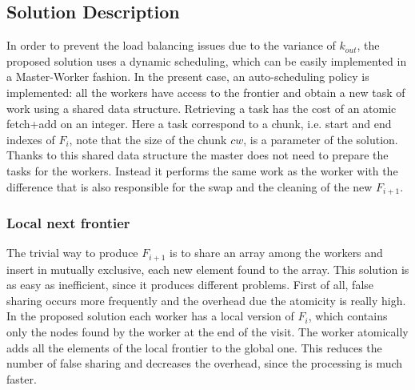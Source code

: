\subsection{Solution Description}
In order to prevent the load balancing issues 
due to the variance of $k_{out}$, the proposed solution
uses a dynamic scheduling, which can be easily implemented
in a Master-Worker fashion. In the
present case, an auto-scheduling policy is implemented:  all the workers have access to the frontier
and obtain a new task of work using a shared
data structure. Retrieving a task has the cost of an
atomic fetch+add on an integer. Here a task correspond to a chunk, i.e.
 start and end indexes of $F_i$, note that the size of the chunk $cw$,
 is a parameter of the solution. Thanks to this shared data structure
 the master does not need to
 prepare the tasks for the workers. Instead it performs the same work as 
 the worker with the difference that is also responsible for 
 the swap and the cleaning of the new $F_{i+1}$. 
\subsubsection{Local next frontier}
The trivial way to produce $F_{i+1}$ is to share an array among the workers and insert in mutually exclusive, each new element found to the array. This solution is as easy as inefficient, since it produces different problems. First of all, false sharing occurs more frequently and the overhead due the atomicity is really high. In the proposed solution each worker has a local version of $F_i$, which contains only the nodes found by the worker at the end of the visit. The worker atomically adds all the elements of the local frontier to the global one. This reduces the number of false sharing and decreases the overhead, since the processing is much faster.  
